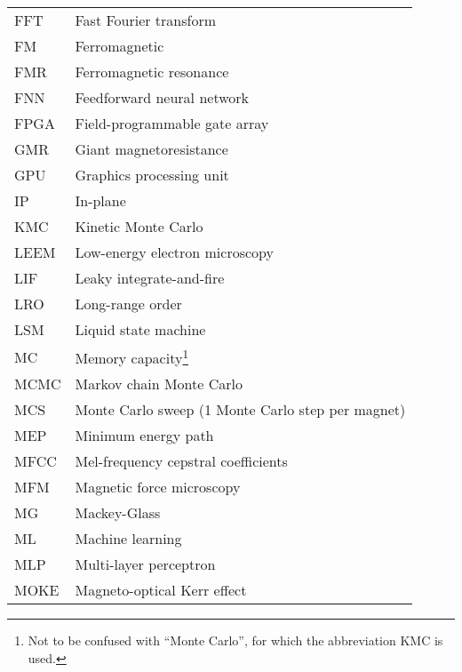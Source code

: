 {\begin{longtable}[l]{ll}
        FFT   & Fast Fourier transform                      \\
        FM    & Ferromagnetic                               \\
        FMR   & Ferromagnetic resonance                     \\
        FNN   & Feedforward neural network                  \\
        FPGA  & Field-programmable gate array               \\
        GMR   & Giant magnetoresistance                     \\
        GPU   & Graphics processing unit                    \\
        IP    & In-plane                                    \\
        KMC   & Kinetic Monte Carlo                         \\
        LEEM  & Low-energy electron microscopy              \\
        LIF   & Leaky integrate-and-fire                    \\
        LRO   & Long-range order                            \\
        LSM   & Liquid state machine                        \\
        MC    & Memory capacity\footnote{Not to be confused with ``Monte Carlo'', for which the abbreviation KMC is used.} \\
        MCMC  & Markov chain Monte Carlo                    \\
        MCS   & Monte Carlo sweep (1 Monte Carlo step per magnet) \\
        MEP   & Minimum energy path                         \\
        MFCC  & Mel-frequency cepstral coefficients         \\
        MFM   & Magnetic force microscopy                   \\
        MG    & Mackey-Glass                                \\
        ML    & Machine learning                            \\
        MLP   & Multi-layer perceptron                      \\
        MOKE  & Magneto-optical Kerr effect                 \\

\end{longtable}}
